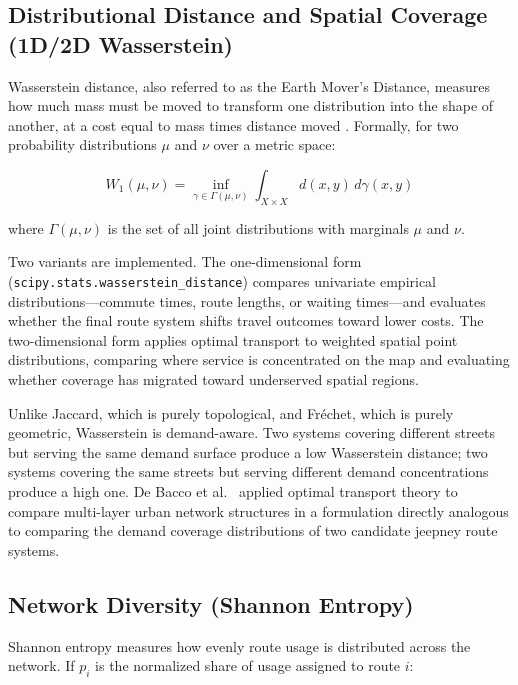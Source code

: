 {{%
\subsection{Distributional Distance and Spatial Coverage (1D/2D Wasserstein)}
\label{sec:wasserstein}
\noindent
Wasserstein distance, also referred to as the Earth Mover's Distance, measures how much mass must be moved to transform one distribution into the shape of another, at a cost equal to mass times distance moved \citep{debacco2023optimaltransport}. Formally, for two probability distributions $\mu$ and $\nu$ over a metric space:

\[
W_1(\mu,\nu) = \inf_{\gamma \in \Gamma(\mu,\nu)}
  \int_{X \times X} d(x,y)\, d\gamma(x,y)
\]

where $\Gamma(\mu,\nu)$ is the set of all joint distributions with marginals
$\mu$ and $\nu$.

Two variants are implemented. The one-dimensional form
(\texttt{scipy.stats.wasserstein\_distance}) compares univariate empirical distributions—commute times, route lengths, or waiting times—and evaluates whether the final route system shifts travel outcomes toward lower costs. The two-dimensional form applies optimal transport to weighted spatial point distributions, comparing where service is concentrated on the map and evaluating whether coverage has migrated toward underserved spatial regions.

Unlike Jaccard, which is purely topological, and Fréchet, which is purely geometric, Wasserstein is demand-aware. Two systems covering different streets but serving the same demand surface produce a low Wasserstein distance; two systems covering the same streets but serving different demand concentrations produce a high one. De Bacco et al.\ \citeyearpar{debacco2023optimaltransport} applied optimal transport theory to compare multi-layer urban network structures in a formulation directly analogous to comparing the demand coverage distributions of two candidate jeepney route systems.

\subsection{Network Diversity (Shannon Entropy)}
\label{sec:entropy}
\noindent
Shannon entropy measures how evenly route usage is distributed across the network. If $p_i$ is the normalized share of usage assigned to route $i$:

}}
